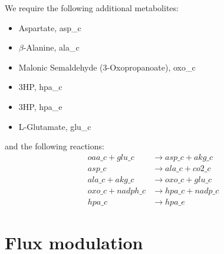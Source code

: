 \documentclass{scrartcl}
\begin{document}
	We require the following additional metabolites:
	\begin{itemize}
		\item Aspartate, asp\_c
		\item $\beta$-Alanine, ala\_c
		\item Malonic Semaldehyde (3-Oxopropanoate), oxo\_c
		\item 3HP, hpa\_c
		\item 3HP, hpa\_e
		\item L-Glutamate, glu\_c
	\end{itemize}
	and the following reactions:
	\begin{align}
		oaa\_c + glu\_c &\rightarrow asp\_c + akg\_c \\
		asp\_c &\rightarrow ala\_c + co2\_c\\
		ala\_c + akg\_c &\rightarrow oxo\_c + glu\_c\\
		oxo\_c + nadph\_c &\rightarrow hpa\_c + nadp\_c\\
		hpa\_c &\rightarrow hpa\_e
	\end{align}
\section{Flux modulation}

\printbibliography
\end{document}

